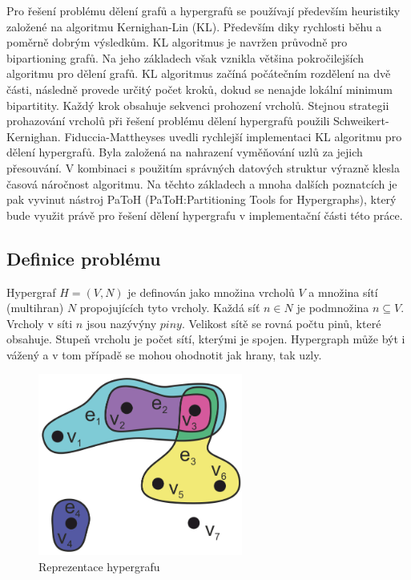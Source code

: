 \documentclass[thesis=M,czech]{FITthesis}[2012/06/26]
\begin{document}
Pro řešení problému dělení grafů a hypergrafů se používají především heuristiky založené na algoritmu Kernighan-Lin (KL). Především diky rychlosti běhu a poměrně dobrým výsledkům. KL algoritmus je navržen průvodně pro bipartioning grafů. Na jeho základech však vznikla většina pokročilejších algoritmu pro dělení grafů. KL algoritmus začíná počátečním rozdělení na dvě části, následně provede určitý počet kroků, dokud se nenajde lokální minimum bipartitity. Každý krok obsahuje sekvenci prohození vrcholů. Stejnou strategii prohazování vrcholů při řešení problému dělení hypergrafů použili Schweikert-Kernighan\cite{graph1}. Fiduccia-Mattheyses\cite{graph2} uvedli rychlejší implementaci KL algoritmu pro dělení hypergrafů. Byla založená na nahrazení vyměňování uzlů za jejich přesouvání.  V kombinaci s použitím správných datových struktur výrazně klesla časová náročnost algoritmu. Na těchto základech a mnoha dalších poznatcích je pak vyvinut nástroj PaToH (PaToH:Partitioning Tools for Hypergraphs), který bude využit právě pro řešení dělení hypergrafu v implementační části této práce.

\subsection{Definice problému}
Hypergraf $H=(V,N)$ je definován jako množina vrcholů $V$ a množina	sítí (multihran) $N$ propojujících tyto vrcholy. Každá síť $n \in N$ je podmnožina $n \subseteq V$. Vrcholy v síti $n$ jsou nazývýny $piny$. Velikost sítě se rovná počtu pinů, které obsahuje. Stupeň vrcholu je počet sítí, kterými je spojen. Hypergraph může být i vážený a v tom případě se mohou ohodnotit jak hrany, tak uzly.

\begin{figure}\centering
	\includegraphics[width=0.6\textwidth, angle=0]{files/Hypergraph.png}
	\caption[Reprezentace hypergrafu]{Reprezentace hypergrafu}\label{fig:hypergraph}
\end{figure}
\end{document}
